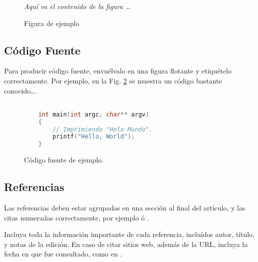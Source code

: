 \documentclass[a4paper,10pt,twocolumn]{article}
\begin{document}
		\begin{figure}[htb]%
		\begin{center}
			\emph{Aquí va el contenido de la figura \ldots}
		\end{center}
		\caption{Figura de ejemplo \label{fig:ex}}%
		\end{figure}

	\subsection{Código Fuente}\label{sub:listings}
		Para producir código fuente, envuélvalo en una figura flotante y
		etiquételo correctamente. Por ejemplo, en la Fig. \ref{fig:code}
		se muestra un código bastante conocido\ldots.


		\begin{figure}[htb]%
			\begin{lstlisting}[language=c]%

    int main(int argc, char** argv)
    {
        // Imprimiendo "Hola Mundo".
        printf("Hello, World");
    }

			\end{lstlisting}
		\caption{Código fuente de ejemplo.\label{fig:code}}
		\end{figure}

	\subsection{Referencias}
  	Las referencias deben estar agrupadas en una sección al final del artículo,
  	y las citas numeradas correctamente, por ejemplo \cite{knuth} ó \cite{goedel}.

  	Incluya toda la información importante de cada referencia, incluídos autor,
  	título, y notas de la edición. En caso de citar sitios web, además
  	de la URL, incluya la fecha en que fue consultado, como en \cite{wiki}.

\end{document}

